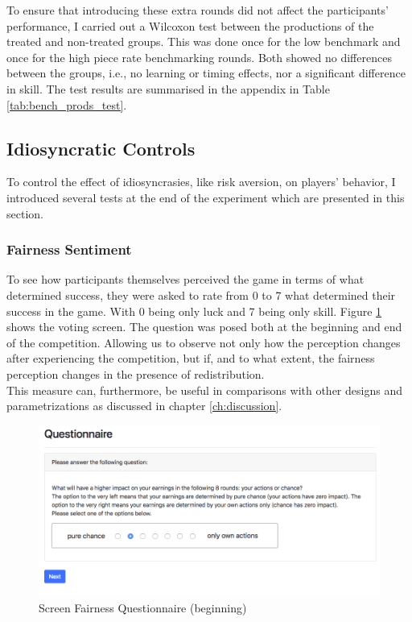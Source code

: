     To ensure that introducing these extra rounds did not affect the participants' performance, I carried out a Wilcoxon test between the productions of the treated and non-treated groups. This was done once for the low benchmark and once for the high piece rate benchmarking rounds. Both showed no differences between the groups, i.e., no learning or timing effects, nor a significant difference in skill. The test results are summarised in the appendix in Table \ref{tab:bench_prods_test}.
    
    \subsection{Idiosyncratic Controls}
    
    To control the effect of idiosyncrasies, like risk aversion, on players' behavior, I introduced several tests at the end of the experiment which are presented in this section. 
    
    \subsubsection{Fairness Sentiment}
    
    To see how participants themselves perceived the game in terms of what determined success, they were asked to rate from 0 to 7 what determined their success in the game. With 0 being only luck and 7 being only skill. Figure \ref{fig:fair_q} shows the voting screen. The question was posed both at the beginning and end of the competition. Allowing us to observe not only how the perception changes after experiencing the competition, but if, and to what extent, the fairness perception changes in the presence of redistribution.\\
    
    This measure can, furthermore, be useful in comparisons with other designs and parametrizations as discussed in chapter \ref{ch:discussion}.
    
    \begin{figure}
        \centering
        \includegraphics[width=\textwidth]{graphs/Fairness_Q_Begin.png}
        \caption{Screen Fairness Questionnaire (beginning)}
        \label{fig:fair_q}
    \end{figure}
    
